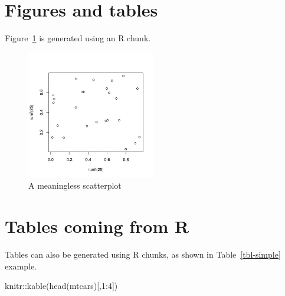 \documentclass[
  super,
  preprint,
  3p]{elsarticle}
\newenvironment{Shaded}{\begin{snugshade}}{\end{snugshade}}
\newcommand{\DecValTok}[1]{\textcolor[rgb]{0.68,0.00,0.00}{#1}}
\newcommand{\FunctionTok}[1]{\textcolor[rgb]{0.28,0.35,0.67}{#1}}
\newcommand{\NormalTok}[1]{\textcolor[rgb]{0.00,0.23,0.31}{#1}}
\newcommand{\SpecialCharTok}[1]{\textcolor[rgb]{0.37,0.37,0.37}{#1}}
\begin{document}
\hypertarget{figures-and-tables}{%
\section{Figures and tables}\label{figures-and-tables}}

Figure~\ref{fig-meaningless} is generated using an R chunk.

\begin{figure}

{\centering \includegraphics[width=0.5\textwidth,height=\textheight]{meu_dir_files/figure-pdf/fig-meaningless-1.pdf}

}

\caption{\label{fig-meaningless}A meaningless scatterplot}

\end{figure}

\hypertarget{tables-coming-from-r}{%
\section{Tables coming from R}\label{tables-coming-from-r}}

Tables can also be generated using R chunks, as shown in
Table~\ref{tbl-simple} example.

\begin{Shaded}
\begin{Highlighting}[]
\NormalTok{knitr}\SpecialCharTok{::}\FunctionTok{kable}\NormalTok{(}\FunctionTok{head}\NormalTok{(mtcars)[,}\DecValTok{1}\SpecialCharTok{:}\DecValTok{4}\NormalTok{])}
\end{Highlighting}
\end{Shaded}
\end{document}
